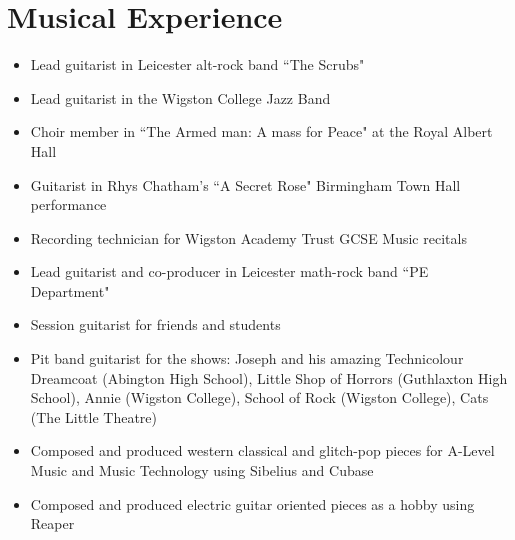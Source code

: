 \documentclass{article}
\begin{document}
\section{Musical Experience}
\begin{itemize}[noitemsep]

\renewcommand{\labelitemi}{$\square$}
\item Lead guitarist in Leicester alt-rock band ``The Scrubs"
\item Lead guitarist in the Wigston College Jazz Band
\item Choir member in ``The Armed man: A mass for Peace" at the Royal Albert Hall
\item Guitarist in Rhys Chatham's ``A Secret Rose" Birmingham Town Hall performance
\item Recording technician for Wigston Academy Trust GCSE Music recitals
\item Lead guitarist and co-producer in Leicester math-rock band ``PE Department"
\item Session guitarist for friends and students
\item Pit band guitarist for the shows: Joseph and his amazing Technicolour Dreamcoat (Abington High School),
Little Shop of Horrors (Guthlaxton High School), Annie (Wigston College), School of Rock (Wigston College), Cats (The Little Theatre)
\item Composed and produced western classical and glitch-pop pieces for A-Level Music and Music Technology using Sibelius and Cubase
\item Composed and produced electric guitar oriented pieces as a hobby using Reaper

\end{itemize}
\end{document}
